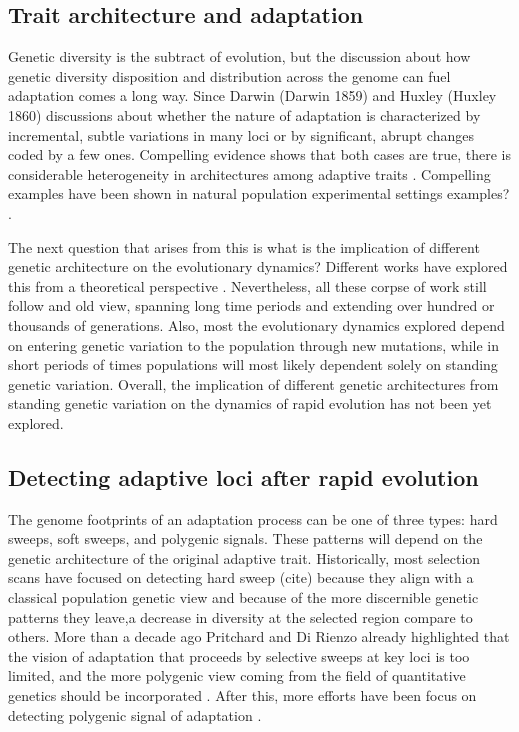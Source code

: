 \documentclass{article}
\begin{document}
\subsection{Trait architecture and adaptation}
Genetic diversity is the subtract of evolution, but the discussion about how genetic diversity disposition and distribution across the genome can fuel adaptation comes a long way. Since Darwin (Darwin 1859) and Huxley (Huxley 1860) discussions about whether the nature of adaptation is characterized by incremental, subtle variations in many loci or by significant, abrupt changes coded by a few ones. Compelling evidence shows that both cases are true, there is considerable heterogeneity in architectures among adaptive traits \citep{Orr1992-xj, Orr1998-pr}. Compelling examples have been shown in natural population experimental settings examples? . 

The next question that arises from this is what is the implication of different genetic architecture on the evolutionary dynamics? Different works have explored this from a theoretical perspective \citep{Hayward2021-ji, Stetter2018-st, Thornton2019-ww}. Nevertheless, all these corpse of work still follow and old view, spanning long time periods and extending over hundred or thousands of generations. Also, most the evolutionary dynamics explored depend on entering genetic variation to the population through new mutations, while in short periods of times populations will most likely dependent solely on standing genetic variation. Overall, the implication of different genetic architectures from standing genetic variation on the dynamics of rapid evolution has not been yet explored. 

\subsection{Detecting adaptive loci after rapid evolution}
The genome footprints of an adaptation process can be one of three types: hard sweeps, soft sweeps, and polygenic signals. These patterns will depend on the genetic architecture of the original adaptive trait. Historically, most selection scans have focused on detecting hard sweep (cite) because they align with a classical population genetic view and because of the more discernible genetic patterns they leave,a decrease in diversity at the selected region compare to others. More than a decade ago Pritchard and Di Rienzo already highlighted that the vision of adaptation that proceeds by selective sweeps at key loci is too limited, and the more polygenic view coming from the field of quantitative genetics should be incorporated \citep{Pritchard2010-bv}. After this, more efforts have been focus on detecting polygenic signal of adaptation \citep{Berg2014-zl}.
\end{document}
